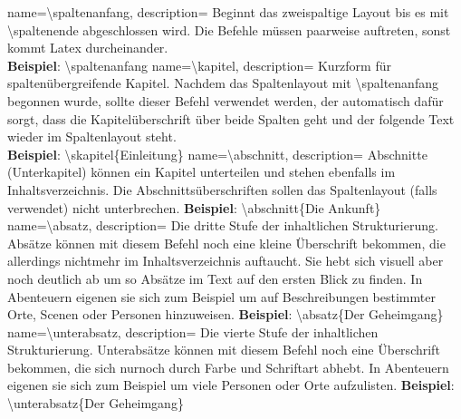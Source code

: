 {
    name={\textbackslash spaltenanfang},
    description={
            Beginnt das zweispaltige Layout bis es mit \textbackslash spaltenende abgeschlossen wird. Die Befehle müssen paarweise auftreten, sonst kommt Latex durcheinander.\\
            \textbf{Beispiel}: \textbackslash spaltenanfang}
}
{
    name={\textbackslash kapitel},
    description={
            Kurzform für spaltenübergreifende Kapitel. Nachdem das Spaltenlayout mit \textbackslash spaltenanfang begonnen wurde, sollte dieser Befehl verwendet werden, der automatisch dafür sorgt, dass die Kapitelüberschrift über beide Spalten geht und der folgende Text wieder im Spaltenlayout steht.\\
            \textbf{Beispiel}: \textbackslash skapitel\{Einleitung\}
        }
}
{
    name={\textbackslash abschnitt},
    description={
            Abschnitte (Unterkapitel) können ein Kapitel unterteilen und stehen ebenfalls im Inhaltsverzeichnis. Die Abschnittsüberschriften sollen das Spaltenlayout (falls verwendet) nicht unterbrechen.\newline
            \textbf{Beispiel}: \textbackslash abschnitt\{Die Ankunft\}
        }
}
{
    name={\textbackslash absatz},
    description={
            Die dritte Stufe der inhaltlichen Strukturierung. Absätze können mit diesem Befehl noch eine kleine Überschrift bekommen, die allerdings nichtmehr im Inhaltsverzeichnis auftaucht. Sie hebt sich visuell aber noch deutlich ab um so Absätze im Text auf den ersten Blick zu finden. In Abenteuern eigenen sie sich zum Beispiel um auf Beschreibungen bestimmter Orte, Scenen oder Personen hinzuweisen.
            \newline
            \textbf{Beispiel}: \textbackslash absatz\{Der Geheimgang\}
        }
}
{
    name={\textbackslash unterabsatz},
    description={
            Die vierte Stufe der inhaltlichen Strukturierung. Unterabsätze können mit diesem Befehl noch eine Überschrift bekommen, die sich nurnoch durch Farbe und Schriftart abhebt. In Abenteuern eigenen sie sich zum Beispiel um viele Personen oder Orte aufzulisten.
            \newline
            \textbf{Beispiel}: \textbackslash unterabsatz\{Der Geheimgang\}
        }
}

